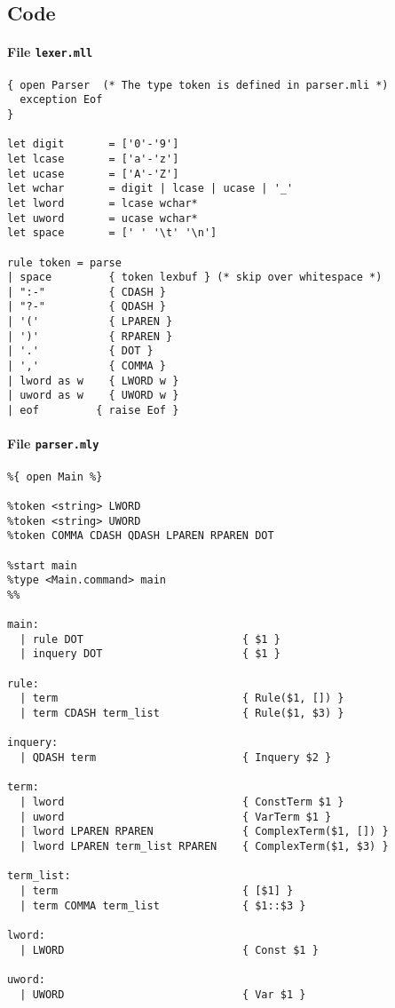 \documentclass{article}
\begin{document}
\subsection*{Code}
\paragraph{File \tt lexer.mll}
\begin{verbatim}
{ open Parser  (* The type token is defined in parser.mli *)
  exception Eof
}

let digit       = ['0'-'9']
let lcase       = ['a'-'z']
let ucase       = ['A'-'Z']
let wchar       = digit | lcase | ucase | '_'
let lword       = lcase wchar*
let uword       = ucase wchar*
let space       = [' ' '\t' '\n']

rule token = parse
| space         { token lexbuf } (* skip over whitespace *)
| ":-"          { CDASH }
| "?-"          { QDASH }
| '('           { LPAREN }
| ')'           { RPAREN }
| '.'           { DOT }
| ','           { COMMA }
| lword as w    { LWORD w }
| uword as w    { UWORD w }
| eof		  { raise Eof }
\end{verbatim}

\paragraph{File \tt parser.mly}
\begin{verbatim}
%{ open Main %}

%token <string> LWORD
%token <string> UWORD
%token COMMA CDASH QDASH LPAREN RPAREN DOT

%start main
%type <Main.command> main
%%

main:
  | rule DOT                         { $1 }
  | inquery DOT                      { $1 }

rule:
  | term                             { Rule($1, []) }
  | term CDASH term_list             { Rule($1, $3) }

inquery:
  | QDASH term                       { Inquery $2 }

term:
  | lword                            { ConstTerm $1 }
  | uword                            { VarTerm $1 }
  | lword LPAREN RPAREN              { ComplexTerm($1, []) }
  | lword LPAREN term_list RPAREN    { ComplexTerm($1, $3) }

term_list:
  | term                             { [$1] }
  | term COMMA term_list             { $1::$3 }

lword:
  | LWORD                            { Const $1 }

uword: 
  | UWORD                            { Var $1 }
\end{verbatim}
\end{document}
